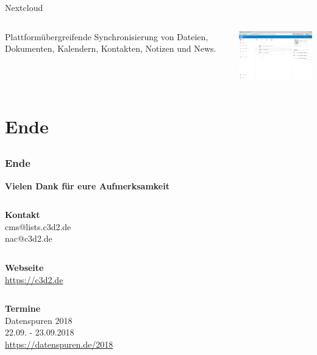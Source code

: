 \documentclass[12pt, table]{beamer}
\begin{document}
\begin{frame}{Nextcloud}
	\begin{columns}
		\column{4cm}
		\footnotesize
		Plattformübergreifende Synchronisierung von Dateien, Dokumenten, Kalendern, Kontakten, Notizen und News.
		\column{6cm}
		\begin{center}
			\includegraphics[width=6cm]{../img/nextcloud.png}
			\par
		\end{center}
	\end{columns}
\end{frame}

\section{Ende}
\subsection{}

\begin{frame}
	\frametitle{Ende}
	\begin{center}
		\textbf{Vielen Dank für eure Aufmerksamkeit}
	\end{center}
	\par
	\begin{columns}
		\column{3cm}
	\end{columns}
	\begin{center}
		\textbf{Kontakt}\\
		cms@lists.c3d2.de\\
		nac@c3d2.de\\
		\begin{columns}
			\column{3cm}
		\end{columns}
		\textbf{Webseite}\\
		\url{https://c3d2.de}
		\begin{columns}
			\column{3cm}
		\end{columns}
		\textbf{Termine}\\
		Datenspuren 2018\\
		22.09. - 23.09.2018\\
		\url{https://datenspuren.de/2018}
	\end{center}				
\end{frame}
\end{document}
